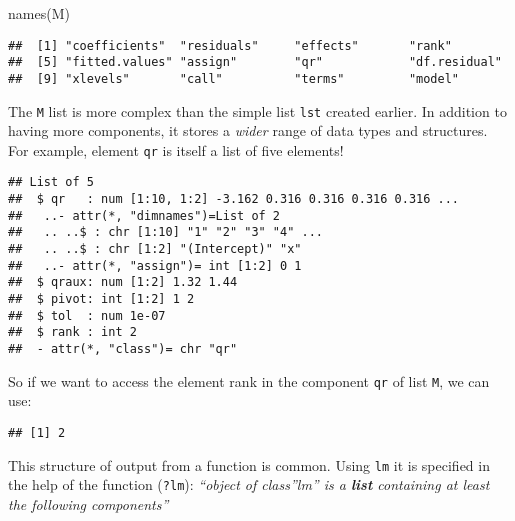 \documentclass[
]{article}
\newenvironment{Shaded}{\begin{snugshade}}{\end{snugshade}}
\newcommand{\FunctionTok}[1]{\textcolor[rgb]{0.00,0.00,0.00}{#1}}
\newcommand{\NormalTok}[1]{#1}
\newcommand{\SpecialCharTok}[1]{\textcolor[rgb]{0.00,0.00,0.00}{#1}}
\begin{document}
\begin{Shaded}
\begin{Highlighting}[]
\FunctionTok{names}\NormalTok{(M)}
\end{Highlighting}
\end{Shaded}

\begin{verbatim}
##  [1] "coefficients"  "residuals"     "effects"       "rank"         
##  [5] "fitted.values" "assign"        "qr"            "df.residual"  
##  [9] "xlevels"       "call"          "terms"         "model"
\end{verbatim}

The \texttt{M} list is more complex than the simple list \texttt{lst}
created earlier. In addition to having more components, it stores a
\emph{wider} range of data types and structures. For example, element
\texttt{qr} is itself a list of five elements!

\begin{Shaded}
\end{Shaded}

\begin{verbatim}
## List of 5
##  $ qr   : num [1:10, 1:2] -3.162 0.316 0.316 0.316 0.316 ...
##   ..- attr(*, "dimnames")=List of 2
##   .. ..$ : chr [1:10] "1" "2" "3" "4" ...
##   .. ..$ : chr [1:2] "(Intercept)" "x"
##   ..- attr(*, "assign")= int [1:2] 0 1
##  $ qraux: num [1:2] 1.32 1.44
##  $ pivot: int [1:2] 1 2
##  $ tol  : num 1e-07
##  $ rank : int 2
##  - attr(*, "class")= chr "qr"
\end{verbatim}

So if we want to access the element rank in the component \texttt{qr} of
list \texttt{M}, we can use:

\begin{Shaded}
\end{Shaded}

\begin{verbatim}
## [1] 2
\end{verbatim}

This structure of output from a function is common. Using \texttt{lm} it
is specified in the help of the function (\texttt{?lm}): \emph{``object
of class''lm'' is a \textbf{list} containing at least the following
components''}
\end{document}
